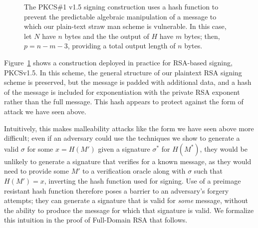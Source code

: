 \begin{figure}[h]
\centering
{}

  \caption{The PKCS\#1 v1.5 signing construction uses a hash function to prevent the predictable algebraic manipulation of a message to which our plain-text straw man scheme is vulnerable.  In this case, let $N$ have $n$ bytes and the the output of $H$ have $m$ bytes; then, $p=n - m - 3$, providing a total output length of $n$ bytes.}
\label{fig:pkcs15sign}
\end{figure}



Figure~\ref{fig:pkcs15sign} shows a construction deployed in practice for RSA-based signing, PKCSv1.5.  In this scheme, the general structure of our plaintext RSA signing scheme is preserved, but the message is padded with additional data, and a hash of the message is included for exponentiation with the private RSA exponent rather than the full message.  This hash appears to protect against the form of attack we have seen above.

Intuitively, this makes malleability attacks like the form we have seen above more difficult; even if an adversary could use the techniques we show to generate a valid $\sigma$ for some $x=H(M')$ given a signature $\sigma^*$ for $H(M^*)$, they would be unlikely to generate a signature that verifies for a known message, as they would need to provide some $M'$ to a verification oracle along with $\sigma$ such that $H(M')=x$, inverting the hash function used for signing.  Use of a preimage resistant hash function therefore poses a barrier to an adversary's forgery attempts; they can generate a signature that is valid for \emph{some} message, without the ability to produce the message for which that signature is valid.  We formalize this intuition in the proof of Full-Domain RSA that follows.

